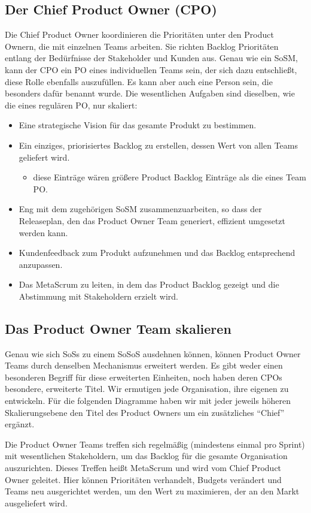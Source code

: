 \documentclass[12pt,a4paper,parskip=full]{scrartcl}
\begin{document}
\subsection{Der Chief Product Owner (CPO)}
Die Chief Product Owner koordinieren die Prioritäten unter den Product Ownern,
die mit einzelnen Teams arbeiten. Sie richten Backlog Prioritäten entlang der
Bedürfnisse der Stakeholder und Kunden aus. Genau wie ein SoSM, kann der CPO ein
PO eines individuellen Teams sein, der sich dazu entschließt, diese Rolle
ebenfalls auszufüllen. Es kann aber auch eine Person sein, die besonders dafür
benannt wurde. Die wesentlichen Aufgaben sind dieselben, wie die eines
regulären PO, nur skaliert:
\begin{itemize}
\item Eine strategische Vision für das gesamte Produkt zu bestimmen.
\item Ein einziges, priorisiertes Backlog zu erstellen, dessen Wert von
allen Teams geliefert wird.
\begin{itemize}
\item diese Einträge wären größere Product Backlog Einträge als die eines Team PO.
\end{itemize}
\item Eng mit dem zugehörigen SoSM zusammenzuarbeiten, so dass der Releaseplan, den das Product Owner Team generiert, effizient umgesetzt werden kann.
\item Kundenfeedback zum Produkt aufzunehmen und das Backlog entsprechend anzupassen.
\item Das MetaScrum zu leiten, in dem das Product Backlog gezeigt und die Abstimmung mit Stakeholdern erzielt wird.
\end{itemize}

\subsection{Das Product Owner Team skalieren}
Genau wie sich SoSs zu einem SoSoS ausdehnen können, können Product Owner
Teams durch denselben Mechanismus erweitert werden. Es gibt weder einen
besonderen Begriff für diese erweiterten Einheiten, noch haben deren CPOs
besondere, erweiterte Titel. Wir ermutigen jede Organisation, ihre eigenen zu
entwickeln. Für die folgenden Diagramme haben wir mit jeder jeweils höheren
Skalierungsebene den Titel des Product Owners um ein zusätzliches ``Chief''
ergänzt.

Die Product Owner Teams treffen sich regelmäßig (mindestens einmal pro Sprint) mit wesentlichen Stakeholdern, um das Backlog für die gesamte Organisation auszurichten. Dieses Treffen heißt MetaScrum und wird vom Chief Product Owner geleitet. Hier können Prioritäten verhandelt, Budgets verändert und Teams neu ausgerichtet werden, um den Wert zu maximieren, der an den Markt ausgeliefert wird.
\end{document}
